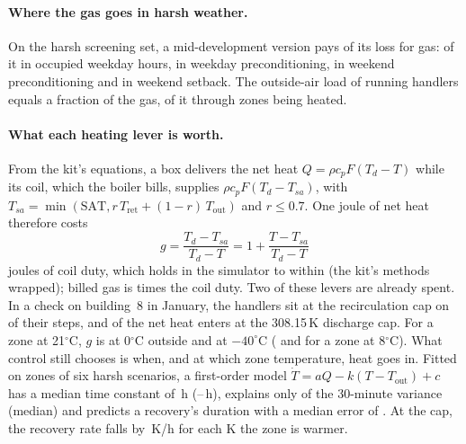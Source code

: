 \paragraph{Where the gas goes in harsh weather.} On the harsh screening set, a mid-development version pays \RSixDecGas{} of its loss for gas: \RSixDecOccWd{} of it in occupied weekday hours, \RSixDecPreWd{} in weekday preconditioning, \RSixDecPreWe{} in weekend preconditioning and \RSixDecSbWe{} in weekend setback. The outside-air load of running handlers equals a fraction \RSixDecVent{} of the gas, \RSixDecVentHeated{} of it through zones being heated.

\paragraph{What each heating lever is worth.}
From the kit's equations, a box delivers the net heat $Q=\rho c_p F (T_d - T)$ while its coil, which the boiler bills, supplies $\rho c_p F (T_d - T_{sa})$, with $T_{sa}=\min(\text{SAT}, r\,T_{\text{ret}} + (1-r)\,T_{\text{out}})$ and $r\le 0.7$. One joule of net heat therefore costs
\begin{equation}
g = \frac{T_d - T_{sa}}{T_d - T} = 1 + \frac{T - T_{sa}}{T_d - T}
\label{eq:g}
\end{equation}
joules of coil duty, which holds in the simulator to within \RSevGErr{} (the kit's methods wrapped); billed gas is \RSevGasOverCoil{} times the coil duty.
Two of these levers are already spent. In a check on building~8 in January, the handlers sit at the recirculation cap on \RSevRecircCapShare{} of their steps, and \RSevCapHeatShare{} of the net heat enters at the 308.15\,K discharge cap. For a zone at 21$^\circ$C, $g$ is \RSevGZero{} at 0$^\circ$C outside and \RSevGMinusForty{} at $-40^\circ$C (\RSevGColdZero{} and \RSevGColdMinusForty{} for a zone at 8$^\circ$C). What control still chooses is when, and at which zone temperature, heat goes in. Fitted on \RSevNZones{} zones of six harsh scenarios, a first-order model $\dot T = aQ - k(T - T_{\text{out}}) + c$ has a median time constant of \RSevTauMed\,h (\RSevTauLo--\RSevTauHi\,h), explains only \RSevRTwo{} of the 30-minute variance (median) and predicts a recovery's duration with a median error of \RSevRecErr. At the cap, the recovery rate falls by \RSevRateSlope\,K/h for each K the zone is warmer.

